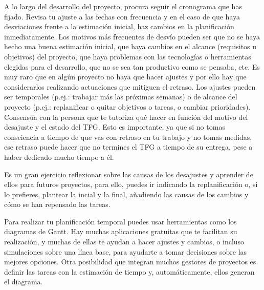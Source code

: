 {A lo largo del desarrollo del proyecto, procura seguir el cronograma que has fijado. Revisa tu ajuste a las fechas con frecuencia y en el caso de que haya desviaciones frente a la estimación inicial, haz cambios en la planificación inmediatamente. Los motivos más frecuentes de desvío pueden ser que no se haya hecho una buena estimación inicial, que haya cambios en el alcance (requisitos u objetivos) del proyecto, que haya problemas con las tecnologías o herramientas elegidas para el desarrollo, que no se sea tan productivo como se pensaba, etc. Es muy raro que en algún proyecto no haya que hacer ajustes y por ello hay que considerarlos realizando actuaciones que mitiguen el retraso. Los ajustes pueden ser temporales (p.ej.: trabajar más las próximas semanas) o de alcance del proyecto (p.ej.: replanificar o quitar objetivos o tareas, o cambiar prioridades). Consensúa con la persona que te tutoriza qué hacer en función del motivo del desajuste y el estado del TFG. Esto es importante, ya que si no tomas consciencia a tiempo de que vas con retraso en tu trabajo y no tomas medidas, ese retraso puede hacer que no termines el TFG a tiempo de su entrega, pese a haber dedicado mucho tiempo a él. 

Es un gran ejercicio reflexionar sobre las causas de los desajustes y aprender de ellos para futuros proyectos, para ello, puedes ir indicando la replanificación o, si lo prefieres, plantear la incial y la final, añadiendo las causas de los cambios y cómo se han repensado las tareas.

Para realizar tu planificación temporal puedes usar herramientas como los diagramas de Gantt. Hay muchas aplicaciones gratuitas que te facilitan su realización, y muchas de ellas te ayudan a hacer ajustes y cambios, o incluso simulaciones sobre una línea base, para ayudarte a tomar decisiones sobre las mejores opciones. Otra posibilidad que integran muchos gestores de proyectos es definir las tareas con la estimación de tiempo y, automáticamente, ellos generan el diagrama.


}
